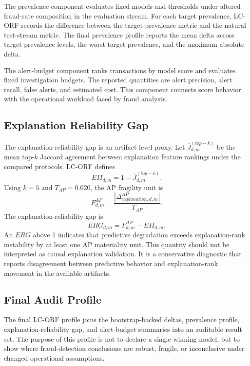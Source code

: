 The prevalence component evaluates fixed models and thresholds under altered fraud-rate composition in the evaluation stream. For each target prevalence, LC-ORF records the difference between the target-prevalence metric and the natural test-stream metric. The final prevalence profile reports the mean delta across target prevalence levels, the worst target prevalence, and the maximum absolute delta.

The alert-budget component ranks transactions by model score and evaluates fixed investigation budgets. The reported quantities are alert precision, alert recall, false alerts, and estimated cost. This component connects score behavior with the operational workload faced by fraud analysts.

\subsection{Explanation Reliability Gap}

The explanation-reliability gap is an artifact-level proxy. Let $\overline{J}^{(top-k)}_{d,m}$ be the mean top-$k$ Jaccard agreement between explanation feature rankings under the compared protocols. LC-ORF defines
\begin{equation}
EII_{d,m}=1-\overline{J}^{(top-k)}_{d,m}.
\end{equation}
Using $k=5$ and $T_{AP}=0.020$, the AP fragility unit is
\begin{equation}
F^{AP}_{d,m}
= \frac{|\Delta^{AP}_{explanation,d,m}|}{T_{AP}}.
\end{equation}
The explanation-reliability gap is
\begin{equation}
ERG_{d,m}=F^{AP}_{d,m}-EII_{d,m}.
\label{eq:erg}
\end{equation}
An $ERG$ above 1 indicates that predictive degradation exceeds explanation-rank instability by at least one AP materiality unit. This quantity should not be interpreted as causal explanation validation. It is a conservative diagnostic that reports disagreement between predictive behavior and explanation-rank movement in the available artifacts.

\subsection{Final Audit Profile}

The final LC-ORF profile joins the bootstrap-backed deltas, prevalence profile, explanation-reliability gap, and alert-budget summaries into an auditable result set. The purpose of this profile is not to declare a single winning model, but to show where fraud-detection conclusions are robust, fragile, or inconclusive under changed operational assumptions.
